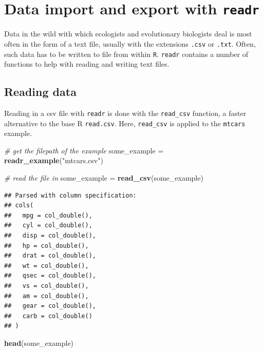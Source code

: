 \documentclass[]{book}
\newenvironment{Shaded}{}{}
\newcommand{\CommentTok}[1]{\textcolor[rgb]{0.38,0.63,0.69}{\textit{#1}}}
\newcommand{\KeywordTok}[1]{\textcolor[rgb]{0.00,0.44,0.13}{\textbf{#1}}}
\newcommand{\NormalTok}[1]{#1}
\newcommand{\StringTok}[1]{\textcolor[rgb]{0.25,0.44,0.63}{#1}}
\begin{document}
\hypertarget{data-import-and-export-with-readr}{%
\section{\texorpdfstring{Data import and export with \texttt{readr}}{Data import and export with readr}}\label{data-import-and-export-with-readr}}

Data in the wild with which ecologists and evolutionary biologists deal is most often in the form of a text file, usually with the extensions \texttt{.csv} or \texttt{.txt}. Often, such data has to be written to file from within \texttt{R}. \texttt{readr} contains a number of functions to help with reading and writing text files.

\hypertarget{reading-data}{%
\subsection{Reading data}\label{reading-data}}

Reading in a csv file with \texttt{readr} is done with the \texttt{read\_csv} function, a faster alternative to the base R \texttt{read.csv}. Here, \texttt{read\_csv} is applied to the \texttt{mtcars} example.

\begin{Shaded}
\begin{Highlighting}[]
\CommentTok{# get the filepath of the example}
\NormalTok{some_example =}\StringTok{ }\KeywordTok{readr_example}\NormalTok{(}\StringTok{"mtcars.csv"}\NormalTok{)}

\CommentTok{# read the file in}
\NormalTok{some_example =}\StringTok{ }\KeywordTok{read_csv}\NormalTok{(some_example)}
\end{Highlighting}
\end{Shaded}

\begin{verbatim}
## Parsed with column specification:
## cols(
##   mpg = col_double(),
##   cyl = col_double(),
##   disp = col_double(),
##   hp = col_double(),
##   drat = col_double(),
##   wt = col_double(),
##   qsec = col_double(),
##   vs = col_double(),
##   am = col_double(),
##   gear = col_double(),
##   carb = col_double()
## )
\end{verbatim}

\begin{Shaded}
\begin{Highlighting}[]
\KeywordTok{head}\NormalTok{(some_example)}
\end{Highlighting}
\end{Shaded}
\end{document}
